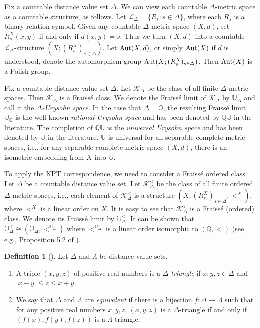 \documentclass[10pt,a4paper]{amsart}
\theoremstyle{definition}
\newtheorem{definition}{Definition}[section]
\theoremstyle{remark}
\begin{document}
Fix a countable distance value set $\Delta$. We can view each countable $\Delta$-metric space as a countable structure, as follows. Let $\mathcal{L}_\Delta=\{R_s\colon s \in \Delta\}$, where each $R_s$ is a binary relation symbol. Given any countable $\Delta$-metric space $(X,d)$,  set $R^X_s(x,y)$ if and only if $d(x,y)=s$. Thus we turn $(X,d)$ into a countable $\mathcal{L}_\Delta$-structure $(X; (R^X_s)_{s\in \Delta})$. Let $\mbox{\rm Aut}(X,d)$, or simply $\mbox{\rm Aut}(X)$ if $d$ is understood, denote the automorphism group $\mbox{\rm Aut}(X; (R^X_s)_{s\in \Delta})$. Then $\mbox{\rm Aut}(X)$ is a Polish group. 

Fix a countable distance value set $\Delta$. Let $\mathcal{K}_\Delta$ be the class of all finite $\Delta$-metric spaces. Then $\mathcal{K}_\Delta$ is a Fra\"iss\'e class. We denote the Fra\"iss\'e limit of $\mathcal{K}_\Delta$ by $\mathbb{U}_{\Delta}$ and call it the {\em $\Delta$-Urysohn space}. In the case that $\Delta = \mathbb{Q}$, the resulting Fra\"iss\'e limit $\mathbb{U}_{\mathbb{Q}}$ is the well-known {\em rational Urysohn space} and has been denoted by $\mathbb{QU}$ in the literature.  The completion of $\mathbb{QU}$ is the {\em universal Urysohn space} and has been denoted by $\mathbb{U}$ in the literature. $\mathbb{U}$ is universal for all separable complete metric spaces, i.e., for any separable complete metric space $(X,d)$, there is an isometric embedding from $X$ into $\mathbb{U}$. 

    To apply the KPT correspondence, we need to consider a Fra\"iss\'e ordered class. Let $\Delta$ be a countable distance value set. Let $\mathcal{K}_\Delta^<$ be the class of all finite ordered $\Delta$-metric spaces, i.e., each element of $\mathcal{K}_\Delta^<$ is a structure $(X; (R_s^X)_{s\in \Delta}, <^X)$, where $<^X$ is a linear order on $X$. %
It is easy to see that $\mathcal{K}_\Delta^<$ is a Fra\"iss\'e (ordered) class. We denote its Fra\"iss\'e limit by $\mathbb{U}_\Delta^<$. It can be shown that $\mathbb{U}_\Delta^< \cong (\mathbb{U}_\Delta, <^{\mathbb{U}_\Delta})$ where $<^{\mathbb{U}_\Delta}$ is a linear order isomorphic to $(\mathbb{Q}, <)$ (see, e.g., Proposition 5.2 of \cite{KPT}). 

\begin{definition}[\cite{EGLMM}]\label{def:CDVSequiv} Let $\Delta$ and $\Lambda$ be distance value sets. 
\begin{enumerate}
\item[(i)] A triple $(x,y,z)$ of positive real numbers is a {\em $\Delta$-triangle} if $x,y, z\in \Delta$ and $|x-y|\leq z\leq x+y$.
\item[(ii)] We say that $\Delta$ and $\Lambda$ are {\em equivalent} if there is a bijection $f\colon \Delta\to \Lambda$ such that for any positive real numbers $x,y, z$, $(x,y,z)$ is a $\Delta$-triangle if and only if $(f(x), f(y), f(z))$ is a $\Lambda$-triangle.
\end{enumerate}
\end{definition}
\end{document}
